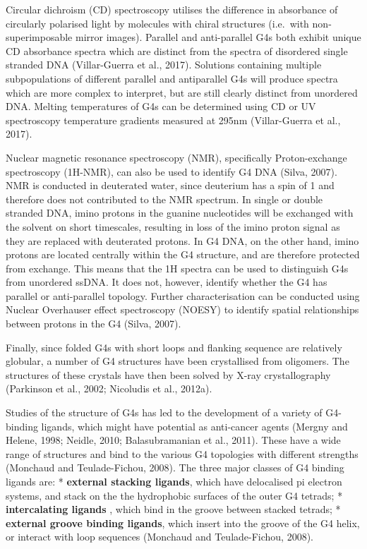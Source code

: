 \documentclass[12pt,a4paper,]{report}
\begin{document}
Circular dichroism (CD) spectroscopy utilises the difference in
absorbance of circularly polarised light by molecules with chiral
structures (i.e.~with non-superimposable mirror images). Parallel and
anti-parallel G4s both exhibit unique CD absorbance spectra which are
distinct from the spectra of disordered single stranded DNA
(Villar-Guerra et al., 2017). Solutions containing multiple
subpopulations of different parallel and antiparallel G4s will produce
spectra which are more complex to interpret, but are still clearly
distinct from unordered DNA. Melting temperatures of G4s can be
determined using CD or UV spectroscopy temperature gradients measured at
295nm (Villar-Guerra et al., 2017).

Nuclear magnetic resonance spectroscopy (NMR), specifically
Proton-exchange spectroscopy (1H-NMR), can also be used to identify G4
DNA (Silva, 2007). NMR is conducted in deuterated water, since deuterium
has a spin of 1 and therefore does not contributed to the NMR spectrum.
In single or double stranded DNA, imino protons in the guanine
nucleotides will be exchanged with the solvent on short timescales,
resulting in loss of the imino proton signal as they are replaced with
deuterated protons. In G4 DNA, on the other hand, imino protons are
located centrally within the G4 structure, and are therefore protected
from exchange. This means that the 1H spectra can be used to distinguish
G4s from unordered ssDNA. It does not, however, identify whether the G4
has parallel or anti-parallel topology. Further characterisation can be
conducted using Nuclear Overhauser effect spectroscopy (NOESY) to
identify spatial relationships between protons in the G4 (Silva, 2007).

Finally, since folded G4s with short loops and flanking sequence are
relatively globular, a number of G4 structures have been crystallised
from oligomers. The structures of these crystals have then been solved
by X-ray crystallography (Parkinson et al., 2002; Nicoludis et al.,
2012a).

Studies of the structure of G4s has led to the development of a variety
of G4-binding ligands, which might have potential as anti-cancer agents
(Mergny and Helene, 1998; Neidle, 2010; Balasubramanian et al., 2011).
These have a wide range of structures and bind to the various G4
topologies with different strengths (Monchaud and Teulade-Fichou, 2008).
The three major classes of G4 binding ligands are: * \textbf{external
stacking ligands}, which have delocalised pi electron systems, and stack
on the the hydrophobic surfaces of the outer G4 tetrads; *
\textbf{intercalating ligands} , which bind in the groove between
stacked tetrads; * \textbf{external groove binding ligands}, which
insert into the groove of the G4 helix, or interact with loop sequences
(Monchaud and Teulade-Fichou, 2008).
\end{document}
